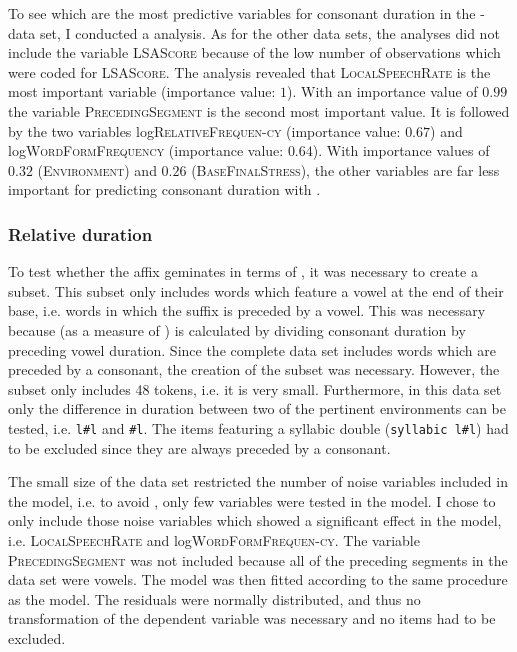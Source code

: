 To see which are the most predictive variables for consonant duration in the -data set, I conducted a  analysis. As for the other data sets, the analyses did not include the variable \textsc{LSAScore} because of the low number of observations which were coded for \textsc{LSAScore}. The analysis revealed that \textsc{LocalSpeechRate} is the most important variable (importance value: $1$). With an importance value of $0.99$ the variable \textsc{PrecedingSegment} is the second most important value. It is followed by the two  variables log\textsc{RelativeFrequen-cy} (importance value: $0.67$) and log\textsc{WordFormFrequency} (importance value: $0.64$). With importance values of $0.32$ (\textsc{Environment}) and $0.26$ (\textsc{BaseFinalStress}), the other variables are far less important for predicting consonant duration with .


\subsubsection{Relative duration}

To test whether the affix  geminates in terms of , it was necessary to create a subset. This subset only includes words which feature a vowel at the end of their base, i.e. words in which the suffix is preceded by a vowel. This was necessary because  (as a measure of ) is calculated by dividing consonant duration by preceding vowel duration. Since the complete data set includes words which are preceded by a consonant, the creation of the subset was necessary.
However, the subset only includes 48 tokens, i.e. it is very small. Furthermore, in this data set only the difference in duration between two of the pertinent environments can be tested, i.e. \texttt{l\#l} and \texttt{\#l}. The items featuring a syllabic double (\texttt{syllabic l\#l}) had to be excluded since they are always preceded by a consonant. 

The small size of the data set restricted the number of noise variables included in the model, i.e. to avoid , only few variables were tested in the model. I chose to only include those noise variables which showed a significant effect in the  model, i.e. \textsc{LocalSpeechRate} and log\textsc{WordFormFrequen-cy}. The variable \textsc{PrecedingSegment} was not included because all of the preceding segments in the data set were vowels. The model was then fitted according to the same procedure as the  model. The residuals were normally distributed, and thus no transformation of the dependent variable was necessary and no items had to be excluded.


